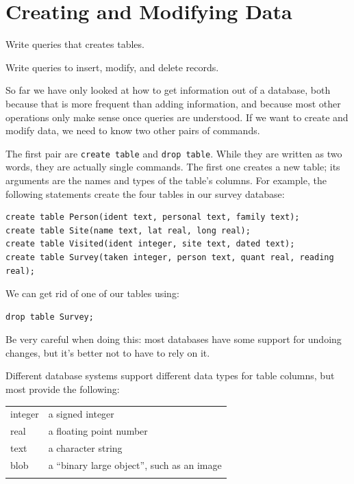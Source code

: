 \documentclass{book}
\begin{document}
\section{Creating and Modifying Data}

\begin{objectives}
\begin{swcitemize}
\item
  Write queries that creates tables.
\item
  Write queries to insert, modify, and delete records.
\end{swcitemize}
\end{objectives}

So far we have only looked at how to get information out of a database,
both because that is more frequent than adding information, and because
most other operations only make sense once queries are understood. If we
want to create and modify data, we need to know two other pairs of
commands.

The first pair are \texttt{create table} and \texttt{drop table}. While
they are written as two words, they are actually single commands. The
first one creates a new table; its arguments are the names and types of
the table's columns. For example, the following statements create the
four tables in our survey database:

\begin{verbatim}
create table Person(ident text, personal text, family text);
create table Site(name text, lat real, long real);
create table Visited(ident integer, site text, dated text);
create table Survey(taken integer, person text, quant real, reading real);
\end{verbatim}

We can get rid of one of our tables using:

\begin{verbatim}
drop table Survey;
\end{verbatim}

Be very careful when doing this: most databases have some support for
undoing changes, but it's better not to have to rely on it.

Different database systems support different data types for table
columns, but most provide the following:

\begin{tabular}{@{}ll@{}}
\hline\noalign{\medskip}
integer & a signed integer
\\\noalign{\medskip}
real & a floating point number
\\\noalign{\medskip}
text & a character string
\\\noalign{\medskip}
blob & a ``binary large object'', such as an image
\\\noalign{\medskip}
\hline
\end{tabular}
\end{document}
